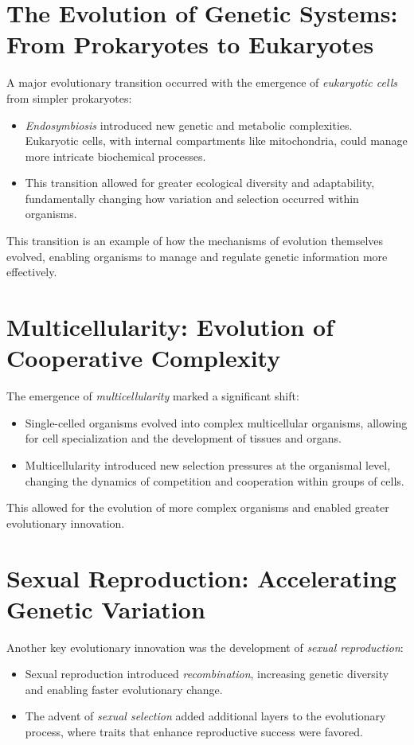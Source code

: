 \documentclass[12pt,titlepage]{book}
\begin{document}
\section{The Evolution of Genetic Systems: From Prokaryotes to Eukaryotes}

A major evolutionary transition occurred with the emergence of \textit{eukaryotic cells} from simpler prokaryotes:
\begin{itemize}
    \item \textit{Endosymbiosis} introduced new genetic and metabolic complexities. Eukaryotic cells, with internal compartments like mitochondria, could manage more intricate biochemical processes.
    \item This transition allowed for greater ecological diversity and adaptability, fundamentally changing how variation and selection occurred within organisms.
\end{itemize}

This transition is an example of how the mechanisms of evolution themselves evolved, enabling organisms to manage and regulate genetic information more effectively.

\section{Multicellularity: Evolution of Cooperative Complexity}

The emergence of \textit{multicellularity} marked a significant shift:
\begin{itemize}
    \item Single-celled organisms evolved into complex multicellular organisms, allowing for cell specialization and the development of tissues and organs.
    \item Multicellularity introduced new selection pressures at the organismal level, changing the dynamics of competition and cooperation within groups of cells.
\end{itemize}

This allowed for the evolution of more complex organisms and enabled greater evolutionary innovation.

\section{Sexual Reproduction: Accelerating Genetic Variation}

Another key evolutionary innovation was the development of \textit{sexual reproduction}:
\begin{itemize}
    \item Sexual reproduction introduced \textit{recombination}, increasing genetic diversity and enabling faster evolutionary change.
    \item The advent of \textit{sexual selection} added additional layers to the evolutionary process, where traits that enhance reproductive success were favored.
\end{itemize}
\end{document}
